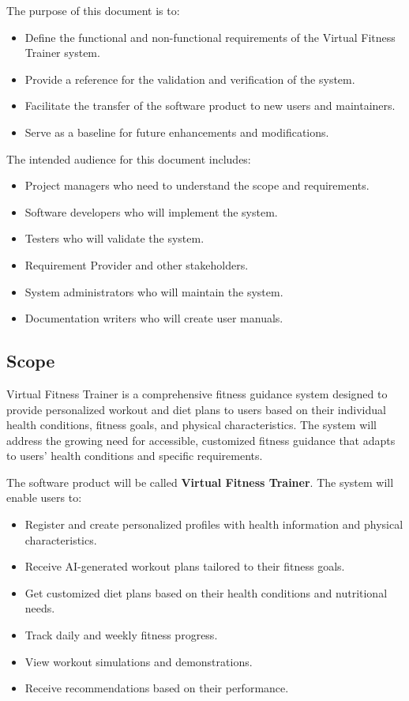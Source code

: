 \documentclass[12pt,a4paper]{article}
\begin{document}
The purpose of this document is to:
\begin{itemize}
    \item Define the functional and non-functional requirements of the Virtual Fitness Trainer system.
    \item Provide a reference for the validation and verification of the system.
    \item Facilitate the transfer of the software product to new users and maintainers.
    \item Serve as a baseline for future enhancements and modifications.
\end{itemize}

The intended audience for this document includes:
\begin{itemize}
    \item Project managers who need to understand the scope and requirements.
    \item Software developers who will implement the system.
    \item Testers who will validate the system.
    \item Requirement Provider and other stakeholders.
    \item System administrators who will maintain the system.
    \item Documentation writers who will create user manuals.
\end{itemize}

\subsection{Scope}
Virtual Fitness Trainer is a comprehensive fitness guidance system designed to provide personalized workout and diet plans to users based on their individual health conditions, fitness goals, and physical characteristics. The system will address the growing need for accessible, customized fitness guidance that adapts to users' health conditions and specific requirements.

The software product will be called \textbf{Virtual Fitness Trainer}. The system will enable users to:

\begin{itemize}
    \item Register and create personalized profiles with health information and physical characteristics.
    \item Receive AI-generated workout plans tailored to their fitness goals.
    \item Get customized diet plans based on their health conditions and nutritional needs.
    \item Track daily and weekly fitness progress.
    \item View workout simulations and demonstrations.
    \item Receive recommendations based on their performance.
\end{itemize}
\end{document}

